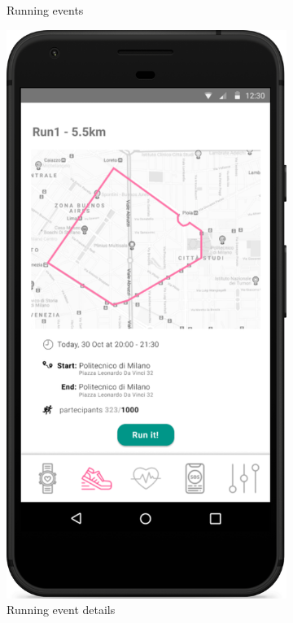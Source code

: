 \documentclass[../main.tex]{subfiles}
\begin{document}
\begin{figure}[H]
\begin{subfigure}[b]{0.45\linewidth}
		\caption{Running events}
		\label{mock_track4Run}
	\end{subfigure}
	\begin{subfigure}[b]{0.45\linewidth}
		\includegraphics[width=\linewidth]{images/mockup/RunPage.png}
		\caption{Running event details}
		\label{mock_runPage}
	\end{subfigure}
	\caption{}
\end{figure}
\end{document}
